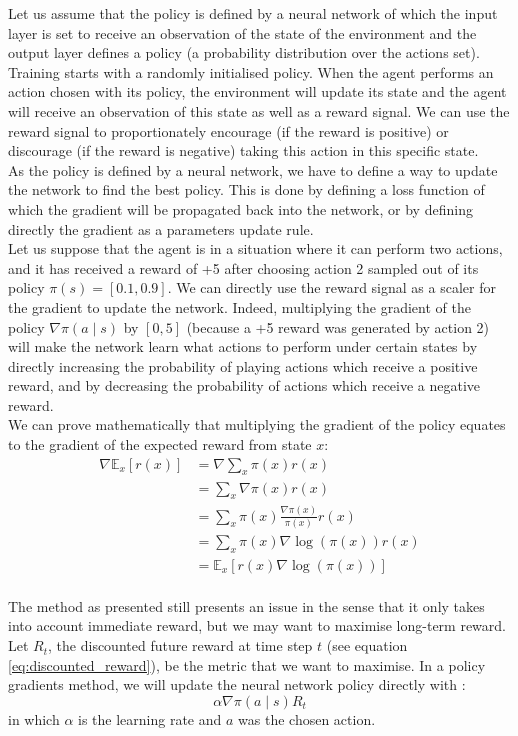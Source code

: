 Let us assume that the
policy is defined by a neural network of which the input layer is set to 
receive an observation of the state of the environment and the output layer
defines a policy (a probability distribution over the actions set).
Training starts with a randomly initialised policy. 
When the agent performs an action chosen with its policy, the environment will
update its state and the agent will receive an observation of this state as
well as a reward signal. We can use the reward signal to proportionately
encourage (if the reward is 
positive) or discourage (if the reward is negative) taking this action in 
this specific state.\\

As the policy is defined by a neural network, we have to define a way to
update the network to find the best policy. This is done by defining a loss
function of which the gradient will be propagated back into the network, or
by defining directly the gradient as a parameters update rule.\\

Let us suppose that the agent is in a situation where it can perform two
actions, and it has received a reward of +5 after choosing action 2
sampled out of its policy $\pi(s) = [0.1, 0.9]$. We can directly use the
reward signal as a scaler for the gradient to update the network. Indeed,
multiplying the gradient of the policy $\nabla \pi(a \mid s)$ by 
$[0, 5]$ (because a +5 reward was generated by action 2) will make the network
learn what actions to perform under certain states by directly increasing the
probability of playing actions which receive a positive reward, and by
decreasing the probability of actions which receive a negative reward.\\

We can prove mathematically that multiplying the gradient of the policy
equates to the gradient of the expected reward from state $x$:
\begin{align*}
	\nabla \mathbb{E}_x[r(x)] &= \nabla \sum\limits_x\pi(x)r(x)\\
	&=  \sum\limits_x \nabla\pi(x)r(x)\\
	&=  \sum\limits_x \pi(x)\frac{\nabla\pi(x)}{\pi(x)}r(x)\\
	&=  \sum\limits_x \pi(x)\nabla\log(\pi(x))r(x)\\
	&=  \mathbb{E}_x[r(x)\nabla\log(\pi(x))]\\
\end{align*}

The method as presented still presents an issue in the sense that it only takes
into account immediate reward, but we may want to maximise long-term reward.
Let $R_t$, the discounted future reward at time step $t$ (see equation 
\ref{eq:discounted_reward}), be the metric
that we want to maximise. In a policy gradients method, we will update the
neural network policy directly with :
\begin{equation}
	\label{eq:policy_update_rule}
	\alpha \nabla \pi(a \mid s) R_t
\end{equation}
in which $\alpha$ is the learning rate and $a$ was the chosen action.

